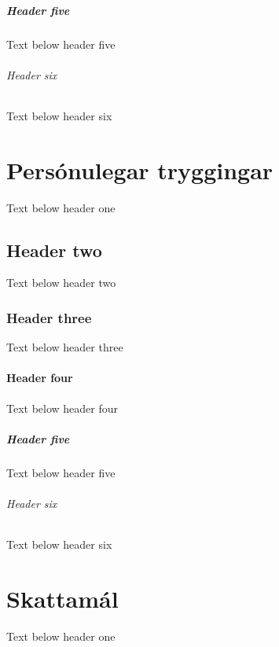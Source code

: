 \documentclass[a4paper,10pt,icelandic]{sphinxmanual}
\begin{document}
\paragraph{Header five}
\label{\detokenize{skuldir-og-lan/index:header-five}}
\sphinxAtStartPar
Text below header five


\subparagraph{Header six}
\label{\detokenize{skuldir-og-lan/index:header-six}}
\sphinxAtStartPar
Text below header six

\sphinxstepscope


\chapter{Persónulegar tryggingar}
\label{\detokenize{personulegar-tryggingar/index:personulegar-tryggingar}}\label{\detokenize{personulegar-tryggingar/index::doc}}
\sphinxAtStartPar
Text below header one


\section{Header two}
\label{\detokenize{personulegar-tryggingar/index:header-two}}
\sphinxAtStartPar
Text below header two


\subsection{Header three}
\label{\detokenize{personulegar-tryggingar/index:header-three}}
\sphinxAtStartPar
Text below header three


\subsubsection{Header four}
\label{\detokenize{personulegar-tryggingar/index:header-four}}
\sphinxAtStartPar
Text below header four


\paragraph{Header five}
\label{\detokenize{personulegar-tryggingar/index:header-five}}
\sphinxAtStartPar
Text below header five


\subparagraph{Header six}
\label{\detokenize{personulegar-tryggingar/index:header-six}}
\sphinxAtStartPar
Text below header six

\sphinxstepscope


\chapter{Skattamál}
\label{\detokenize{skattamal/index:skattamal}}\label{\detokenize{skattamal/index::doc}}
\sphinxAtStartPar
Text below header one
\end{document}
